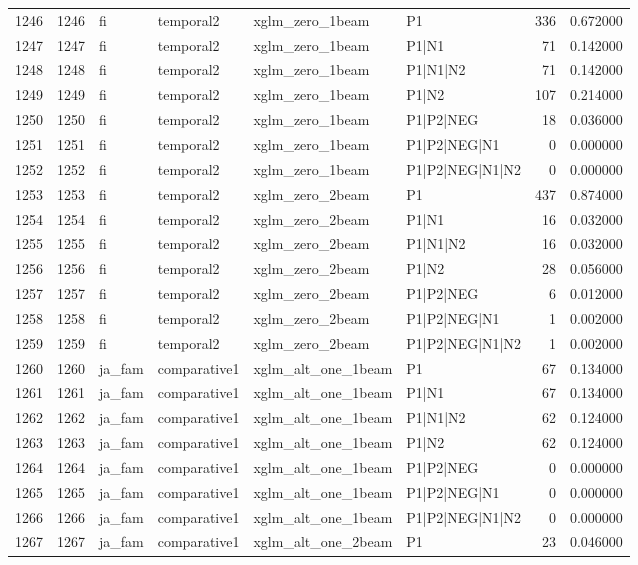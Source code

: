 \begin{tabular}{lrllllrr}
1246 & 1246 & fi & temporal2 & xglm_zero_1beam & P1 & 336 & 0.672000 \\
1247 & 1247 & fi & temporal2 & xglm_zero_1beam & P1|N1 & 71 & 0.142000 \\
1248 & 1248 & fi & temporal2 & xglm_zero_1beam & P1|N1|N2 & 71 & 0.142000 \\
1249 & 1249 & fi & temporal2 & xglm_zero_1beam & P1|N2 & 107 & 0.214000 \\
1250 & 1250 & fi & temporal2 & xglm_zero_1beam & P1|P2|NEG & 18 & 0.036000 \\
1251 & 1251 & fi & temporal2 & xglm_zero_1beam & P1|P2|NEG|N1 & 0 & 0.000000 \\
1252 & 1252 & fi & temporal2 & xglm_zero_1beam & P1|P2|NEG|N1|N2 & 0 & 0.000000 \\
1253 & 1253 & fi & temporal2 & xglm_zero_2beam & P1 & 437 & 0.874000 \\
1254 & 1254 & fi & temporal2 & xglm_zero_2beam & P1|N1 & 16 & 0.032000 \\
1255 & 1255 & fi & temporal2 & xglm_zero_2beam & P1|N1|N2 & 16 & 0.032000 \\
1256 & 1256 & fi & temporal2 & xglm_zero_2beam & P1|N2 & 28 & 0.056000 \\
1257 & 1257 & fi & temporal2 & xglm_zero_2beam & P1|P2|NEG & 6 & 0.012000 \\
1258 & 1258 & fi & temporal2 & xglm_zero_2beam & P1|P2|NEG|N1 & 1 & 0.002000 \\
1259 & 1259 & fi & temporal2 & xglm_zero_2beam & P1|P2|NEG|N1|N2 & 1 & 0.002000 \\
1260 & 1260 & ja_fam & comparative1 & xglm_alt_one_1beam & P1 & 67 & 0.134000 \\
1261 & 1261 & ja_fam & comparative1 & xglm_alt_one_1beam & P1|N1 & 67 & 0.134000 \\
1262 & 1262 & ja_fam & comparative1 & xglm_alt_one_1beam & P1|N1|N2 & 62 & 0.124000 \\
1263 & 1263 & ja_fam & comparative1 & xglm_alt_one_1beam & P1|N2 & 62 & 0.124000 \\
1264 & 1264 & ja_fam & comparative1 & xglm_alt_one_1beam & P1|P2|NEG & 0 & 0.000000 \\
1265 & 1265 & ja_fam & comparative1 & xglm_alt_one_1beam & P1|P2|NEG|N1 & 0 & 0.000000 \\
1266 & 1266 & ja_fam & comparative1 & xglm_alt_one_1beam & P1|P2|NEG|N1|N2 & 0 & 0.000000 \\
1267 & 1267 & ja_fam & comparative1 & xglm_alt_one_2beam & P1 & 23 & 0.046000 \\

\end{tabular}
